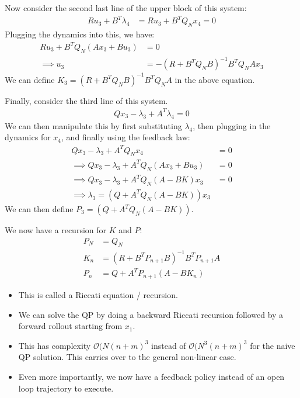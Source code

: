 \noindent
Now consider the second last line of the upper block of this system:
\begin{align}
    R u_3 + B^T \lambda_4 &= R u_3 + B^T Q_N x_4 = 0
\end{align}
Plugging the dynamics into this, we have:
\begin{align}
    R u_3 + B^T Q_N (A x_3 + B u_3) &= 0 \\
    \implies u_3 &= - (R + B^T Q_N B )^{-1} B^T Q_N A x_3
\end{align}
We can define $K_3 = (R + B^T Q_N B )^{-1} B^T Q_N A$ in the above equation.

\noindent
Finally, consider the third line of this system.
\begin{align}
    Q x_3 - \lambda_3 + A^T \lambda_4 = 0
\end{align}
We can then manipulate this by first substituting $\lambda_4$, then plugging in the dynamics for $x_4$, and finally using the feedback law:
\begin{align}
    Q x_3 - \lambda_3 + A^T Q_N x_4 &= 0 \\
    \implies Q x_3 - \lambda_3 + A^T Q_N (A x_3 + B u_3) &= 0 \\
    \implies Q x_3 - \lambda_3 + A^T Q_N (A - B K) x_3 &= 0 \\
    \implies \lambda_3 = (Q + A^T Q_N (A- BK)) x_3
\end{align}
We can then define $P_3 =  (Q + A^T Q_N (A- BK))$.

\noindent
We now have a recursion for $K$ and $P$:
\begin{align}
    P_N &= Q_N \\
    K_n &= (R + B^T P_{n+1} B)^{-1} B^T P_{n+1} A \\
    P_n &= Q + A^T P_{n+1} (A - BK_n)
\end{align}

\begin{itemize}
    \item This is called a Riccati equation / recursion.
    \item We can solve the QP by doing a backward Riccati recursion followed by a forward rollout starting from $x_1$.
    \item This has complexity $\mathcal{O} (N (n+m)^3$ instead of $\mathcal{O} (N^3 (n+m)^3$ for the naive QP solution.
    This carries over to the general non-linear case.
    \item Even more importantly, we now have a feedback policy instead of an open loop trajectory to execute.
\end{itemize}

